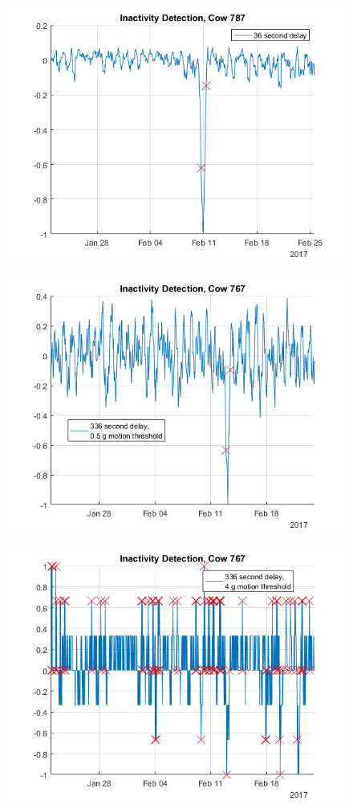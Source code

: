 \begin{figure}[h]
\centering
\includegraphics[width = 0.75 \textwidth]{figures/InactivityDetectionCow787_36period.png}
\caption{}
\label{}
\end{figure}

\begin{figure}[h]
\centering
\includegraphics[width = 0.75 \textwidth]{figures/InactivityDetectionCow767_336period05threshold.png}
\caption{}
\label{}
\end{figure}

\begin{figure}[h]
\centering
\includegraphics[width = 0.75 \textwidth]{figures/InactivityDetectionCow767_336period4threshold.png}
\caption{}
\label{}
\end{figure}


